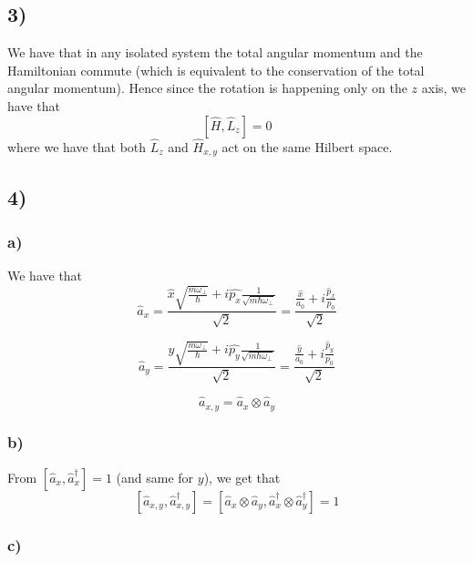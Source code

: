 \documentclass[10pt,a4paper]{book}
\begin{document}
\subsection*{3)}

We have that in any isolated system the total angular momentum and the Hamiltonian commute (which is equivalent to the conservation of the total angular momentum). Hence since the rotation is happening only on the $z$ axis, we have that $$[\hat{H},\hat{L}_z]=0$$
where we have that both $\hat{L}_z$ and $\hat{H}_{x,y}$ act on the same Hilbert space.


\subsection*{4)}

\subsubsection*{a)}

We have that 
$$\hat{a}_x=\frac{\hat{x}\sqrt{\frac{m\omega_{\perp}}{\hbar}}+i\hat{p_x}\frac{1}{\sqrt{m\hbar\omega_{\perp}}}}{\sqrt{2}}=\frac{\frac{\hat{x}}{a_0}+i\frac{\hat{p}_x}{p_0}}{\sqrt{2}}$$

$$\hat{a}_y=\frac{\hat{y}\sqrt{\frac{m\omega_{\perp}}{\hbar}}+i\hat{p_y}\frac{1}{\sqrt{m\hbar\omega_{\perp}}}}{\sqrt{2}}=\frac{\frac{\hat{y}}{a_0}+i\frac{\hat{p}_y}{p_0}}{\sqrt{2}}$$

$$\hat{a}_{x,y}=\hat{a}_x\otimes\hat{a}_y$$

\subsubsection*{b)}
From $[\hat{a}_x,\hat{a}^{\dagger}_x]=1$ (and same for $y$), we get that 
$$[\hat{a}_{x,y},\hat{a}^{\dagger}_{x,y}]=[\hat{a}_x\otimes\hat{a}_y,\hat{a}^{\dagger}_x\otimes \hat{a}^{\dagger}_y]=1$$

\subsubsection*{c)}
\end{document}

